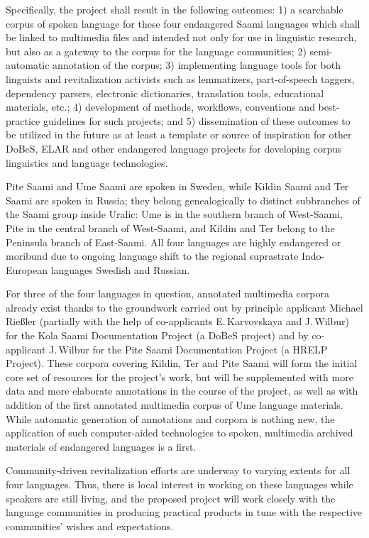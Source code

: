 \documentclass[a4paper,12pt]{article}
\begin{document}
Specifically, the project shall result in the following outcomes: 1) a searchable corpus of spoken language for these four endangered Saami languages which shall be linked to multimedia files and intended not only for use in linguistic research, but also as a gateway to the corpus for the language communities; 2) semi-automatic annotation of the corpus; 3) implementing language tools for both linguists and revitalization activists such as lemmatizers, part-of-speech taggers, dependency parsers, electronic dictionaries, translation tools, educational materials, etc.; 4) development of methods, workflows, conventions and best-practice guidelines for such projects; and
5) dissemination of these outcomes to be utilized in the future as at least a template or source of inspiration for other DoBeS, ELAR and other endangered language projects for developing corpus linguistics and language technologies.

Pite Saami and Ume Saami are spoken in Sweden, while Kildin Saami and Ter Saami are spoken in Russia; they belong genealogically to distinct subbranches of the Saami group inside Uralic: Ume is in the southern branch of West-Saami, Pite in the central branch of West-Saami, and Kildin and Ter belong to the Peninsula branch of East-Saami. All four languages are highly endangered or moribund due to ongoing language shift to the regional suprastrate Indo-European languages Swedish and Russian.

For three of the four languages in question, annotated multimedia corpora already exist thanks to the groundwork carried out by principle applicant Michael Rießler (partially with the help of co-applicants E.\,Karvovskaya and J.\,Wilbur) for the Kola Saami Documentation Project (a DoBeS project) and by co-applicant J.\,Wilbur for the Pite Saami Documentation Project (a HRELP Project). These corpora covering Kildin, Ter and Pite Saami will form the initial core set of resources for the project's work, but will be supplemented with more data and more elaborate annotations in the course of the project, as well as with addition of the first annotated multimedia corpus of Ume language materials. While automatic generation of annotations and corpora is nothing new, the application of such computer-aided technologies to spoken, multimedia archived materials of endangered languages is a first.

Community-driven revitalization efforts are underway to varying extents for all four languages. Thus, there is local interest in working on these languages while speakers are still living, and the proposed project will work closely with the language communities in producing practical products in tune with the respective communities' wishes and expectations.
\end{document}
